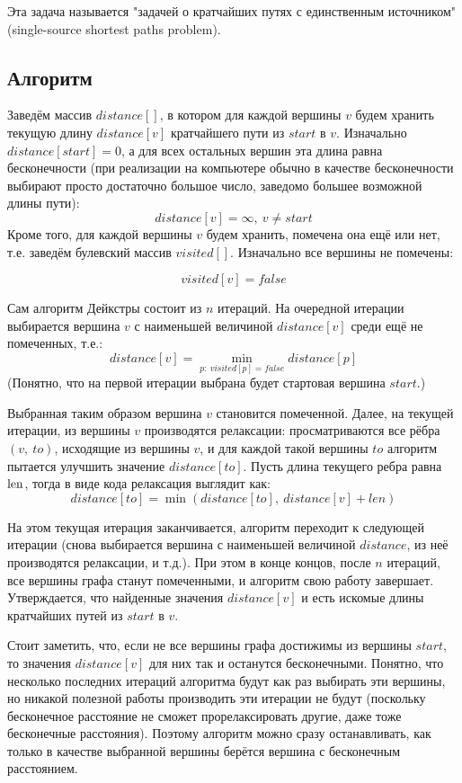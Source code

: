 \documentclass[a4paper,12pt]{article}
\begin{document}
Эта задача называется "задачей о кратчайших путях с единственным источником" (single-source shortest paths problem).

\subsection{Алгоритм}

Заведём массив $distance[]$, в котором для каждой вершины $v$ будем хранить текущую длину $distance[v]$ кратчайшего пути из $start$ в $v$. Изначально $distance[start]=0$, а для всех остальных вершин эта длина равна бесконечности (при реализации на компьютере обычно в качестве бесконечности выбирают просто достаточно большое число, заведомо большее возможной длины пути):\[ distance[v] = \infty,\ v \neq start \]
Кроме того, для каждой вершины $v$ будем хранить, помечена она ещё или нет, т.е. заведём булевский массив $visited[]$. Изначально все вершины не помечены:

\[visited[v] = false\]

Сам алгоритм Дейкстры состоит из $n$ итераций. На очередной итерации выбирается вершина $v$ с наименьшей величиной $distance[v]$ среди ещё не помеченных, т.е.:
\[ distance[v] = \min_{p:\ visited[p]={ false}} distance[p]\] 
(Понятно, что на первой итерации выбрана будет стартовая вершина $start$.)

Выбранная таким образом вершина $v$ становится помеченной. Далее, на текущей итерации, из вершины $v$ производятся релаксации: просматриваются все рёбра $(v,\ to)$, исходящие из вершины $v$, и для каждой такой вершины $to$ алгоритм пытается улучшить значение $distance[to]$. Пусть длина текущего ребра равна $\rm len$, тогда в виде кода релаксация выглядит как:\[ distance[to] = \min (distance[to],\ distance[v] + len) \]

На этом текущая итерация заканчивается, алгоритм переходит к следующей итерации (снова выбирается вершина с наименьшей величиной $distance$, из неё производятся релаксации, и т.д.). При этом в конце концов, после $n$ итераций, все вершины графа станут помеченными, и алгоритм свою работу завершает. Утверждается, что найденные значения $distance[v]$ и есть искомые длины кратчайших путей из $start$ в $v$.

Стоит заметить, что, если не все вершины графа достижимы из вершины $start$, то значения $distance[v]$ для них так и останутся бесконечными. Понятно, что несколько последних итераций алгоритма будут как раз выбирать эти вершины, но никакой полезной работы производить эти итерации не будут (поскольку бесконечное расстояние не сможет прорелаксировать другие, даже тоже бесконечные расстояния). Поэтому алгоритм можно сразу останавливать, как только в качестве выбранной вершины берётся вершина с бесконечным расстоянием.
\end{document}
